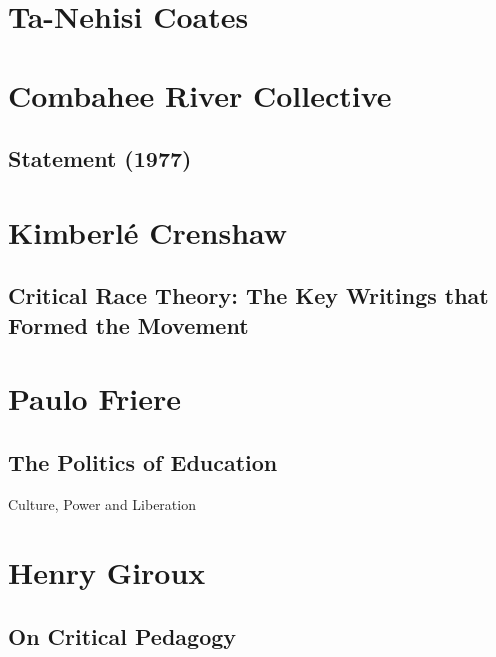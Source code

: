 \documentclass[10pt,titlepage]{book}
\begin{document}
\section{Ta-Nehisi Coates}

\subsection{\cite{coatestnh-bwm,coatestnh-wweyip}}

\section{Combahee River Collective}\label{Combahee}

\subsection{Statement (1977) \cite{combahee-statement}}

\section{Kimberlé Crenshaw}\label{KC}

\subsection{Critical Race Theory: The Key Writings that Formed the Movement \cite{crenshaw1995critical}}

\section{Paulo Friere}\label{Friere}

\subsection{The Politics of Education \cite{friere-poled}}

Culture, Power and Liberation

\section{Henry Giroux}\label{Giroux}

\subsection{On Critical Pedagogy \cite{giroux-critped}}

\pagebreak
\end{document}
